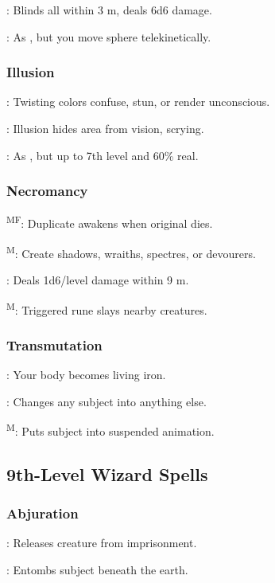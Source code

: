 	: Blinds all within 3 m, deals 6d6 damage.

	: As , but you move sphere telekinetically.

\subsubsection{Illusion}
	: Twisting colors confuse, stun, or render unconscious.

	: Illusion hides area from vision, scrying.

	: As , but up to 7th level and 60\% real.

\subsubsection{Necromancy}
	\textsuperscript{MF}: Duplicate awakens when original dies.

	\textsuperscript{M}: Create shadows, wraiths, spectres, or devourers.

	: Deals 1d6/level damage within 9 m.

	\textsuperscript{M}: Triggered rune slays nearby creatures.

\subsubsection{Transmutation}
	: Your body becomes living iron.

	: Changes any subject into anything else.

	\textsuperscript{M}: Puts subject into suspended animation.



\subsection{9th-Level Wizard Spells}

\subsubsection{Abjuration}
	: Releases creature from imprisonment.

	: Entombs subject beneath the earth.

